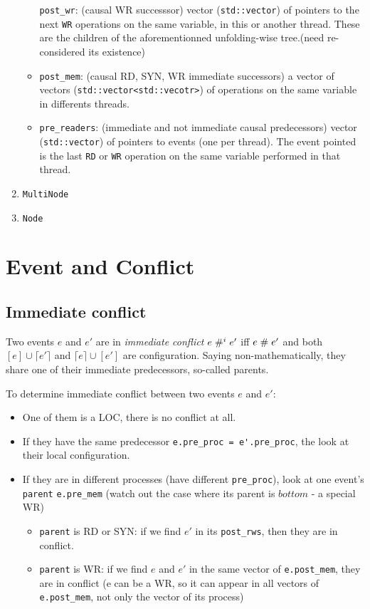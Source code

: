 \documentclass{llncs}
\begin{document}
\begin{enumerate}
\begin{itemize}
  \verb!post_wr!: (causal WR successsor) vector (\verb!std::vector!) of
  pointers to the next \verb!WR! operations on the same variable, in this
  or another thread. These are the children of the aforementionned
  unfolding-wise tree.(need re-considered its existence)
\item
  \verb!post_mem!: (causal RD, SYN, WR immediate successors) a vector of vectors (\verb!std::vector<std::vecotr>!) of operations on the same variable in differents threads. 
	
\item
  \verb!pre_readers!: (immediate and not immediate causal predecessors)
  vector (\verb!std::vector!) of pointers to events (one per thread).
  The event pointed is the last \verb!RD! or \verb!WR! operation on the
  same variable performed in that thread.
\end{itemize}

\item
	\verb!MultiNode!
\item
	\verb!Node!

\end{enumerate}

\section{Event and Conflict}
\subsection{Immediate conflict}
Two events $e$ and $e'$ are in \textit{immediate conflict} $e \mathrel{\#^i_{}} e' $ iff $e \mathrel{\#} e'$ and both $[e] \cup \lceil e' \rceil$ and $ \lceil e \rceil \cup [e']$ are configuration. Saying non-mathematically, they share one of their immediate predecessors, so-called parents.

To determine immediate conflict between two events $e$ and $e'$: 
\begin{itemize}
	\item
	One of them is a LOC, there is no conflict at all.
	\item
	If they have the same predecessor \verb!e.pre_proc = e'.pre_proc!, the look at their local configuration.
	\item
	If they are in different processes (have different \verb!pre_proc!), look at one event's \verb!parent! \verb!e.pre_mem! (watch out the case where its parent is $bottom$ - a special WR)
	\begin{itemize}
		\item
		\verb!parent! is RD or SYN: if we find $e'$ in its \verb!post_rws!, then they are in
		conflict.
		\item
		\verb!parent! is WR: if we find $e$ and $e'$ in the same vector of \verb!e.post_mem!,
		they are in conflict (e can be a WR, so it can appear in all vectors of 
		\verb!e.post_mem!, not only the vector of its process)
	\end{itemize}
	
\end{itemize}
\end{document}
